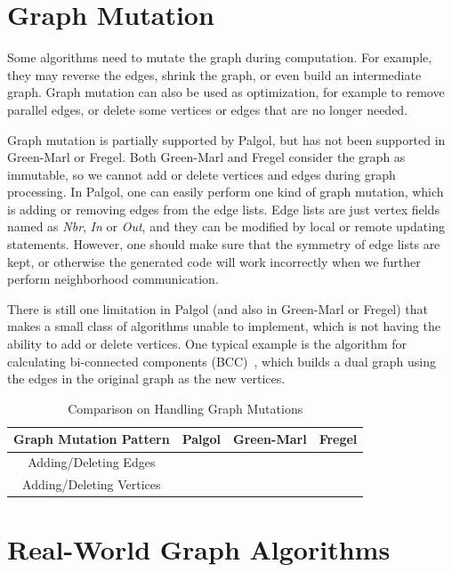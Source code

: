 \documentclass{sokendai_thesis} %
\newcommand{\cmark}{\ding{51}}%
\newcommand{\xmark}{\ding{55}}%
\begin{document}
\section{Graph Mutation}

Some algorithms need to mutate the graph during computation.
For example, they may reverse the edges, shrink the graph, or even build an intermediate graph.
Graph mutation can also be used as optimization, for example to remove parallel edges, or delete some vertices or edges that are no longer needed.

Graph mutation is partially supported by Palgol, but has not been supported in Green-Marl or Fregel.
Both Green-Marl and Fregel consider the graph as immutable, so we cannot add or delete vertices and edges during graph processing. 
In Palgol, one can easily perform one kind of graph mutation, which is adding or removing edges from the edge lists.
Edge lists are just vertex fields named as \textit{Nbr}, \textit{In} or \textit{Out}, and they can be modified by local or remote updating statements.
However, one should make sure that the symmetry of edge lists are kept, or otherwise the generated code will work incorrectly when we further perform neighborhood communication.

There is still one limitation in Palgol (and also in Green-Marl or Fregel) that makes a small class of algorithms unable to implement, which is not having the ability to add or delete vertices.
One typical example is the algorithm for calculating bi-connected components (BCC)~\cite{connectivity}, which builds a dual graph using the edges in the original graph as the new vertices.

\begin{table}[t]
 \vspace{-2ex}
 \centering
 \caption{Comparison on Handling Graph Mutations}
 \label{tab:gm}
 \begin{tabular}{c|c|c|c}
  \hline
  \textbf{Graph Mutation Pattern} & Palgol & Green-Marl & Fregel \\
  \hline\hline
  Adding/Deleting Edges & \cmark & \xmark & \xmark \\
  \hline
  Adding/Deleting Vertices & \xmark & \xmark & \xmark \\
  \hline
 \end{tabular}
\vspace{-2ex}\end{table}

\section{Real-World Graph Algorithms}
\label{sec:real-algos}
\end{document}

